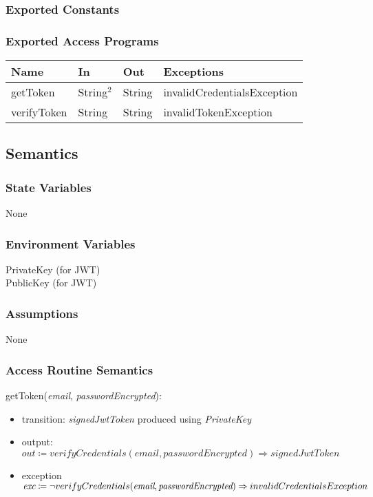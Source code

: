 \documentclass[12pt, titlepage]{article}
\begin{document}
\subsubsection{Exported Constants}

\subsubsection{Exported Access Programs}

\begin{center}
\begin{tabular}{p{5cm} p{3cm} p{3cm} p{5cm}}
\hline
\textbf{Name} & \textbf{In} & \textbf{Out} & \textbf{Exceptions} \\
\hline
getToken & String$^2$ & String & invalidCredentialsException \\
verifyToken & String & String & invalidTokenException \\
\hline
\end{tabular}
\end{center}

\subsection{Semantics}

\subsubsection{State Variables}
None

\subsubsection{Environment Variables}
PrivateKey (for JWT) \\
PublicKey (for JWT)

\subsubsection{Assumptions}
None

\subsubsection{Access Routine Semantics}

\noindent getToken(\textit{email}, \textit{passwordEncrypted}):
\begin{itemize}
\item transition: \textit{signedJwtToken} produced using \textit{PrivateKey}
\item output: \( \textit{out} \coloneqq verifyCredentials(\textit{email}, \textit{passwordEncrypted}) \Rightarrow  signedJwtToken\) \\
\item exception \( \textit{exc} \coloneqq \neg verifyCredentials(\textit{email}, \textit{passwordEncrypted}) \Rightarrow \\ invalidCredentialsException\)
\end{itemize}
\end{document}
